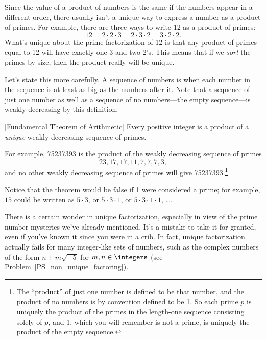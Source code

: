 Since the value of a product of numbers is the same if the numbers
appear in a different order, there usually isn't a unique way to
express a number as a product of primes.  For example, there are three
ways to write 12 as a product of primes:
\[
12 = 2 \cdot 2 \cdot 3 = 2 \cdot 3 \cdot 2 = 3 \cdot 2 \cdot 2.
\]
What's unique about the prime factorization of 12 is that any product
of primes equal to 12 will have exactly one 3 and two 2's.  This means
that if we \emph{sort} the primes by size, then the product really
will be unique.

Let's state this more carefully.  A sequence of numbers is
\emph{} when each number in the sequence is at
least as big as the numbers after it.  Note that a sequence of just
one number as well as a sequence of no numbers---the empty
sequence---is weakly decreasing by this definition.

\begin{theorem}\label{thm:unique_factor}[Fundamental Theorem of Arithmetic]
Every positive integer is a product of a \emph{unique} weakly
decreasing sequence of primes.
\end{theorem}

For example, 75237393 is the product of the weakly decreasing sequence
of primes
\[
23, 17, 17, 11, 7, 7, 7, 3,
\]
and no other weakly decreasing sequence of primes will give
75237393.\footnote{The ``product'' of just one number is defined to be
  that number, and the product of no numbers is by convention defined
  to be 1.  So each prime $p$ is uniquely the product of the primes
  in the length-one sequence consisting solely of $p$, and 1, which you will 
  remember is not a prime, is uniquely the product of the
  empty sequence.}

Notice that the theorem would be false if 1 were considered a prime;
for example, $15$ could be written as $5 \cdot 3$, or $5 \cdot 3 \cdot
1$, or $5 \cdot 3 \cdot 1 \cdot 1$, \dots.

There is a certain wonder in unique factorization, especially in view
of the prime number mysteries we've already mentioned.  It's a mistake
to take it for granted, even if you've known it since you were in a
crib.  In fact, unique factorization actually fails for many
integer-like sets of numbers, such as the complex numbers of the
form $n + m\sqrt{-5}$ for $m,n \in \integers$ (see
Problem~\ref{PS_non_unique_factoring}).

